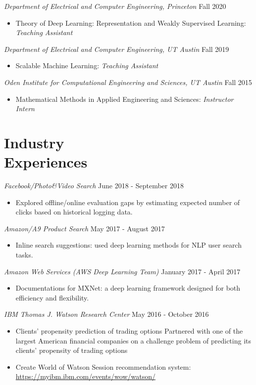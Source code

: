 \documentclass[margin, 10pt]{res} %
\begin{document}
\begin{resume}
{\sl Department of Electrical and Computer Engineering, Princeton} \hfill Fall 2020
\begin{itemize}
	\item Theory of Deep Learning: Representation and Weakly Supervised Learning: {\sl Teaching Assistant}
\end{itemize}


{\sl Department of Electrical and Computer Engineering, UT Austin} \hfill Fall 2019
\begin{itemize}
  \item Scalable Machine Learning: {\sl Teaching Assistant}
  \end{itemize}

{\sl Oden Institute for Computational Engineering and Sciences, UT Austin} \hfill Fall 2015
\begin{itemize}
  \item Mathematical Methods in Applied Engineering and Sciences: {\sl Instructor Intern}
\end{itemize}


\section{Industry\\Experiences}

{\sl Facebook/Photo\&Video Search} \hfill June 2018 - September 2018

\begin{itemize}
	\item  Explored offline/online evaluation gaps by estimating expected number of clicks based on historical logging data.
\end{itemize}

{\sl Amazon/A9 Product Search} \hfill May 2017 - August 2017
\begin{itemize}
	\item Inline search suggestions: used deep learning methods for NLP user search tasks.
\end{itemize}

{\sl Amazon Web Services (AWS Deep Learning Team)} \hfill January 2017 - April 2017
\begin{itemize}
	\item Documentations for MXNet: a deep learning framework designed for 
	both efficiency and flexibility.
\end{itemize}

{\sl IBM Thomas J. Watson Research Center} \hfill May 2016 - October 2016
\begin{itemize}
	\item  Clients' propensity prediction of trading options
	Partnered with one of the largest American financial companies on a challenge problem of predicting its clients' propensity of trading options
	\item Create World of Watson Session recommendation system:\\
	\url{https://myibm.ibm.com/events/wow/watson/}
\end{itemize} 




\end{resume}
\end{document}
